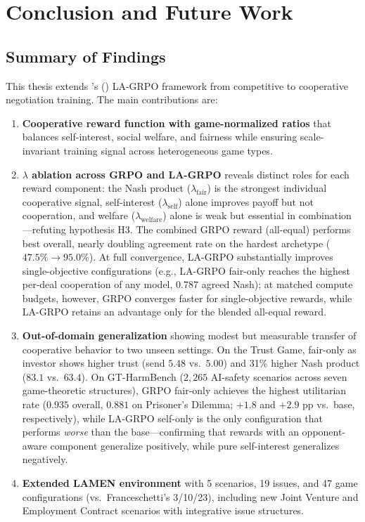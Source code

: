 \documentclass[12pt,a4paper]{article}
\begin{document}
\section{Conclusion and Future Work}
\label{sec:conclusion}

\subsection{Summary of Findings}

This thesis extends \citeauthor{franceschetti2025advantage}'s (\citeyear{franceschetti2025advantage}) LA-GRPO framework from competitive to cooperative negotiation training. The main contributions are:

\begin{enumerate}
    \item \textbf{Cooperative reward function with game-normalized ratios} that balances self-interest, social welfare, and fairness while ensuring scale-invariant training signal across heterogeneous game types.

    \item \textbf{$\lambda$ ablation across GRPO and LA-GRPO} reveals distinct roles for each reward component: the Nash product ($\lambda_{\text{fair}}$) is the strongest individual cooperative signal, self-interest ($\lambda_{\text{self}}$) alone improves payoff but not cooperation, and welfare ($\lambda_{\text{welfare}}$) alone is weak but essential in combination---refuting hypothesis H3. The combined GRPO reward (all-equal) performs best overall, nearly doubling agreement rate on the hardest archetype ($47.5\% \to 95.0\%$). At full convergence, LA-GRPO substantially improves single-objective configurations (e.g., LA-GRPO fair-only reaches the highest per-deal cooperation of any model, $0.787$ agreed Nash); at matched compute budgets, however, GRPO converges faster for single-objective rewards, while LA-GRPO retains an advantage only for the blended all-equal reward.

    \item \textbf{Out-of-domain generalization} showing modest but measurable transfer of cooperative behavior to two unseen settings. On the Trust Game, fair-only as investor shows higher trust (send $5.48$ vs.\ $5.00$) and 31\% higher Nash product ($83.1$ vs.\ $63.4$). On GT-HarmBench ($2{,}265$ AI-safety scenarios across seven game-theoretic structures), GRPO fair-only achieves the highest utilitarian rate ($0.935$ overall, $0.881$ on Prisoner's Dilemma; $+1.8$ and $+2.9$ pp vs.\ base, respectively), while LA-GRPO self-only is the only configuration that performs \emph{worse} than the base---confirming that rewards with an opponent-aware component generalize positively, while pure self-interest generalizes negatively.

    \item \textbf{Extended LAMEN environment} with 5 scenarios, 19 issues, and 47 game configurations (vs.\ Franceschetti's 3/10/23), including new Joint Venture and Employment Contract scenarios with integrative issue structures.
\end{enumerate}
\end{document}
